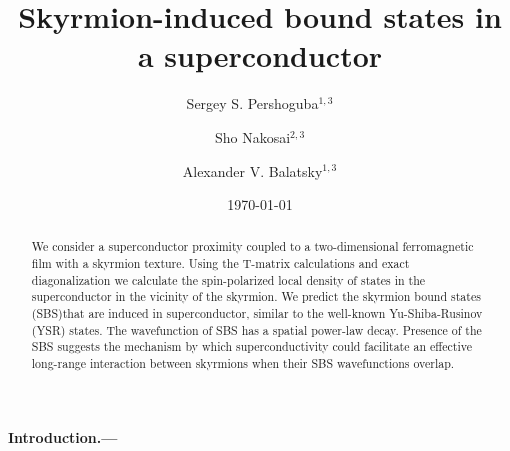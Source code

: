 \documentclass[twocolumn,showpacs,floatfix,longbibliography]{revtex4-1}
\begin{document}
\title{Skyrmion-induced bound states in a superconductor}

\author{Sergey S. Pershoguba$^{1,3}$}
\author{Sho Nakosai$^{2,3}$}
\author{Alexander V. Balatsky$^{1,3}$}



\date{\today}


\begin{abstract}
We consider a superconductor proximity coupled to a two-dimensional ferromagnetic film with a skyrmion texture. Using the T-matrix calculations and exact diagonalization we calculate the spin-polarized local density of states in the superconductor in the vicinity of the skyrmion. We predict the skyrmion bound states (SBS)that are induced in superconductor, similar to the well-known Yu-Shiba-Rusinov (YSR) states. The wavefunction of SBS has a spatial  power-law decay. Presence of the SBS suggests the mechanism by which superconductivity could facilitate an effective long-range interaction between skyrmions when their SBS wavefunctions overlap.
\end{abstract}





\maketitle
\paragraph*{Introduction.---} \label{sec:intro}
\end{document}
